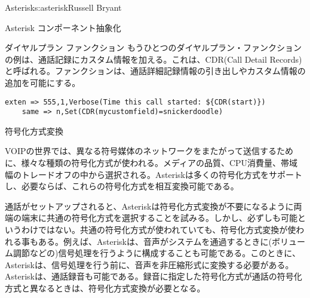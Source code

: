\begin{aosachapter}{Asterisk}{s:asterisk}{Russell Bryant}
\begin{aosasect1}{Asterisk コンポーネント抽象化}
\begin{aosasect2}{ダイヤルプラン ファンクション}
もうひとつのダイヤルプラン・ファンクションの例は、通話記録にカスタム情報を加える。これは、CDR(Call Detail Records)と呼ばれる。ファンクションは、通話詳細記録情報の引き出しやカスタム情報の追加を可能にする。

\begin{verbatim}
exten => 555,1,Verbose(Time this call started: ${CDR(start)})
    same => n,Set(CDR(mycustomfield)=snickerdoodle)
\end{verbatim}

\end{aosasect2}

\pagebreak

\begin{aosasect2}{符号化方式変換}

VOIPの世界では、異なる符号媒体のネットワークをまたがって送信するために、様々な種類の符号化方式が使われる。メディアの品質、CPU消費量、帯域幅のトレードオフの中から選択される。Asteriskは多くの符号化方式をサポートし、必要ならば、これらの符号化方式を相互変換可能である。

通話がセットアップされると、Asteriskは符号化方式変換が不要になるように両端の端末に共通の符号化方式を選択することを試みる。しかし、必ずしも可能というわけではない。共通の符号化方式が使われていても、符号化方式変換が使われる事もある。例えば、Asteriskは、音声がシステムを通過するときに(ボリューム調節などの)信号処理を行うように構成することも可能である。このときに、Asteriskは、信号処理を行う前に、音声を非圧縮形式に変換する必要がある。Asteriskは、通話録音も可能である。録音に指定した符号化方式が通話の符号化方式と異なるときは、符号化方式変換が必要となる。


\end{aosasect2}
\end{aosasect1}
\end{aosachapter}
